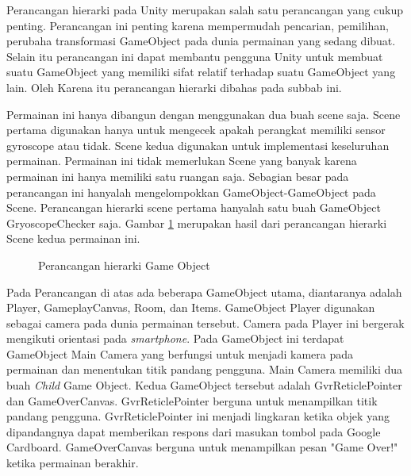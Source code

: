 Perancangan hierarki pada Unity merupakan salah satu perancangan yang cukup penting. Perancangan ini penting karena mempermudah pencarian, pemilihan, perubaha transformasi GameObject pada dunia permainan yang sedang dibuat. Selain itu perancangan ini dapat membantu pengguna Unity untuk membuat suatu GameObject yang memiliki sifat relatif terhadap suatu GameObject yang lain. Oleh Karena itu perancangan hierarki dibahas pada subbab ini.

Permainan ini hanya dibangun dengan menggunakan dua buah scene saja. Scene pertama digunakan hanya untuk mengecek apakah perangkat memiliki sensor gyroscope atau tidak. Scene kedua digunakan untuk implementasi keseluruhan permainan. Permainan ini tidak memerlukan Scene yang banyak karena permainan ini hanya memiliki satu ruangan saja. Sebagian besar pada perancangan ini hanyalah mengelompokkan GameObject-GameObject pada Scene. Perancangan hierarki scene pertama hanyalah satu buah GameObject GryoscopeChecker saja. Gambar \ref{fig:perancangan_hierarki_game_object} merupakan hasil dari perancangan hierarki Scene kedua permainan ini.
\begin{figure}[hbtp]
\caption{Perancangan hierarki Game Object}
\label{fig:perancangan_hierarki_game_object}
\end{figure}

Pada Perancangan di atas ada beberapa GameObject utama, diantaranya adalah Player, GameplayCanvas, Room, dan Items. GameObject Player digunakan sebagai camera pada dunia permainan tersebut. Camera pada Player ini bergerak mengikuti orientasi pada \textit{smartphone}. Pada GameObject ini terdapat GameObject Main Camera yang berfungsi untuk menjadi kamera pada permainan dan menentukan titik pandang pengguna. Main Camera memiliki dua buah \textit{Child} Game Object. Kedua GameObject tersebut adalah GvrReticlePointer dan GameOverCanvas. GvrReticlePointer berguna untuk menampilkan titik pandang pengguna. GvrReticlePointer ini menjadi lingkaran ketika objek yang dipandangnya dapat memberikan respons dari masukan tombol pada Google Cardboard. GameOverCanvas berguna untuk menampilkan pesan "Game Over!" ketika permainan berakhir.


